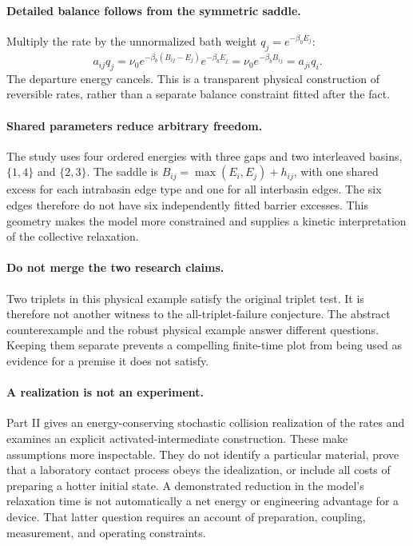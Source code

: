\paragraph{Detailed balance follows from the symmetric saddle.}
Multiply the rate by the unnormalized bath weight $q_j=e^{-\beta_b E_j}$:
\[
a_{ij}q_j
=\nu_0e^{-\beta_b(B_{ij}-E_j)}e^{-\beta_b E_j}
=\nu_0e^{-\beta_b B_{ij}}
=a_{ji}q_i.
\]
The departure energy cancels. This is a transparent physical construction
of reversible rates, rather than a separate balance constraint fitted
after the fact.

\paragraph{Shared parameters reduce arbitrary freedom.}
The study uses four ordered energies with three gaps and two interleaved
basins, $\{1,4\}$ and $\{2,3\}$. The saddle is
$B_{ij}=\max(E_i,E_j)+h_{ij}$, with one shared excess for each intrabasin
edge type and one for all interbasin edges. The six edges therefore do not
have six independently fitted barrier excesses. This geometry makes the
model more constrained and supplies a kinetic interpretation of the
collective relaxation.

\paragraph{Do not merge the two research claims.}
Two triplets in this physical example satisfy the original triplet test.
It is therefore not another witness to the all-triplet-failure conjecture.
The abstract counterexample and the robust physical example answer
different questions. Keeping them separate prevents a compelling finite-time
plot from being used as evidence for a premise it does not satisfy.

\paragraph{A realization is not an experiment.}
Part II gives an energy-conserving stochastic collision realization of the
rates and examines an explicit activated-intermediate construction. These
make assumptions more inspectable. They do not identify a particular
material, prove that a laboratory contact process obeys the idealization,
or include all costs of preparing a hotter initial state. A demonstrated
reduction in the model's relaxation time is not automatically a net energy
or engineering advantage for a device. That latter question requires an
account of preparation, coupling, measurement, and operating constraints.

